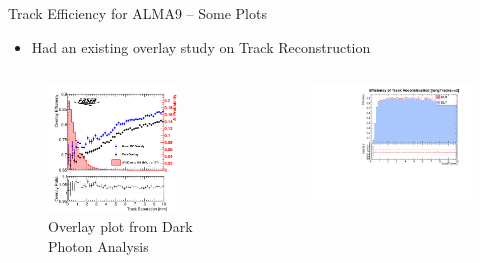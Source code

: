 \begin{frame}{Track Efficiency for ALMA9  -- Some Plots}
    \begin{itemize}
        \item Had an existing overlay study on Track Reconstruction 
    \end{itemize}
    \vspace{-0.5cm}
    \begin{columns}
        \begin{column}{0.5 \textwidth}
            \begin{figure}
                \centering
                \includegraphics[width=0.8\textwidth]{assets/OverlayTracks.png}
                \caption{Overlay plot from Dark Photon Analysis}
            \end{figure}
        \end{column}
        \begin{column}{0.5 \textwidth}
            \begin{figure}
                \centering
                \includegraphics[width=1.1\textwidth]{assets/NEffi_greq2_DeltaR1.pdf}

\end{figure}
\end{column}
\end{columns}
\end{frame}
